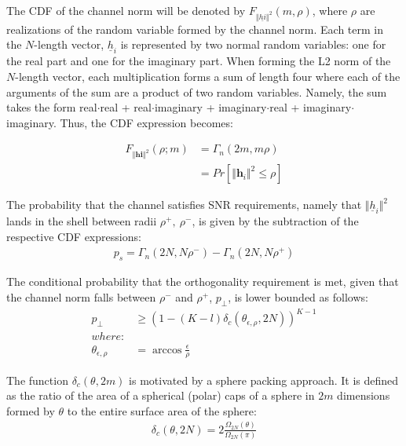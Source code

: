 The CDF of the channel norm will be denoted by $F_{\Vert\underline{hi}\Vert^2}(m,\rho)$, where $\rho$ are realizations of the random variable formed by the channel norm. Each term in the $N$-length vector, $\underline{h}_i$ is represented by two normal random variables: one for the real part and one for the imaginary part. When forming the L2 norm of the $N$-length vector, each multiplication forms a sum of length four where each of the arguments of the sum are a product of two random variables. Namely, the sum takes the form real$\cdot$real + real$\cdot$imaginary + imaginary$\cdot$real + imaginary$\cdot$imaginary. Thus, the CDF expression becomes:

\begin{equation}\label{eq:ch_sq_cdf_chan}
    \begin{aligned}
        F_{\Vert\textbf{hi}\Vert^2}(\rho;m)& = \Gamma_n(2m,m\rho)\\
        &= Pr[\Vert\textbf{h}_i\Vert^2 \leq \rho]
    \end{aligned}
\end{equation}

The probability that the channel satisfies SNR requirements, namely that $\Vert\underline{h}_i\Vert^2$ lands in the shell between radii $\rho^+,\ \rho^-$,  is given by the subtraction of the respective CDF expressions:
\begin{equation}\label{eq:p_s}
    \begin{aligned}
        p_s = \Gamma_n(2N,N\rho^-) - \Gamma_n(2N,N\rho^+)
    \end{aligned}
\end{equation}

The conditional probability that the orthogonality requirement is met, given that the channel norm falls between $\rho^-$ and $\rho^+$, $p_\perp$, is lower bounded as follows:
\begin{equation}\label{eq:p_perp}
    \begin{aligned}
        p_\perp &\geq (1-(K-l)\delta_c(\theta_{\epsilon,\rho},2N))^{K-1}\\
        where:\\
        \theta_{\epsilon,\rho} &= \arccos\frac{\epsilon}{\rho}
    \end{aligned}
\end{equation}

The function $\delta_c(\theta,2m)$ is motivated by a sphere packing approach. It is defined as the ratio of the area of a spherical (polar) caps of a sphere in $2m$ dimensions formed by $\theta$ to the entire surface area of the sphere:
\begin{equation}\label{eq:delta_c_sphere}
    \begin{aligned}
        \delta_c(\theta,2N) = 2\frac{\Omega_{2N}(\theta)}{\Omega_{2N}(\pi)}
    \end{aligned}
\end{equation}

